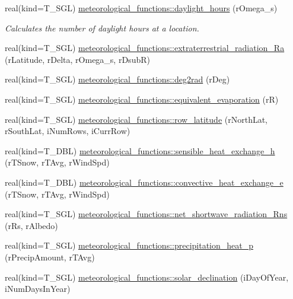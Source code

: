 \begin{DoxyCompactItemize}
\item 
real(kind=T\_\-SGL) \hyperlink{namespacemeteorological__functions_a0228a2c9f92d212730d57a308c27d6a7}{meteorological\_\-functions::daylight\_\-hours} (rOmega\_\-s)
\begin{DoxyCompactList}\small\item\em Calculates the number of daylight hours at a location. \item\end{DoxyCompactList}\item 
real(kind=T\_\-SGL) \hyperlink{namespacemeteorological__functions_a934777cd90ce18fe8fce7d7cfed5bf35}{meteorological\_\-functions::extraterrestrial\_\-radiation\_\-Ra} (rLatitude, rDelta, rOmega\_\-s, rDsubR)
\item 
real(kind=T\_\-SGL) \hyperlink{namespacemeteorological__functions_ad6b54db0b5a7ad72d029c8d4d252e0c3}{meteorological\_\-functions::deg2rad} (rDeg)
\item 
real(kind=T\_\-SGL) \hyperlink{namespacemeteorological__functions_ae644c82b94c9b7d74340c161115f5b7c}{meteorological\_\-functions::equivalent\_\-evaporation} (rR)
\item 
real(kind=T\_\-SGL) \hyperlink{namespacemeteorological__functions_a50fc95bc69ce9e9fd28b0e1696697a7d}{meteorological\_\-functions::row\_\-latitude} (rNorthLat, rSouthLat, iNumRows, iCurrRow)
\item 
real(kind=T\_\-DBL) \hyperlink{namespacemeteorological__functions_af2672c6758aee047fb536dd125dce2f3}{meteorological\_\-functions::sensible\_\-heat\_\-exchange\_\-h} (rTSnow, rTAvg, rWindSpd)
\item 
real(kind=T\_\-DBL) \hyperlink{namespacemeteorological__functions_a90b4e8a09fb5c0597f52bd44adfb2e24}{meteorological\_\-functions::convective\_\-heat\_\-exchange\_\-e} (rTSnow, rTAvg, rWindSpd)
\item 
real(kind=T\_\-SGL) \hyperlink{namespacemeteorological__functions_a35ff0a37cae7cf1ff85ecf7daa47303e}{meteorological\_\-functions::net\_\-shortwave\_\-radiation\_\-Rns} (rRs, rAlbedo)
\item 
real(kind=T\_\-SGL) \hyperlink{namespacemeteorological__functions_abd07fab175427fff1c33d3dc204c385d}{meteorological\_\-functions::precipitation\_\-heat\_\-p} (rPrecipAmount, rTAvg)
\item 
real(kind=T\_\-SGL) \hyperlink{namespacemeteorological__functions_a45a598db078dc2575ce2c0ddcc2f69f0}{meteorological\_\-functions::solar\_\-declination} (iDayOfYear, iNumDaysInYear)

\end{DoxyCompactItemize}
